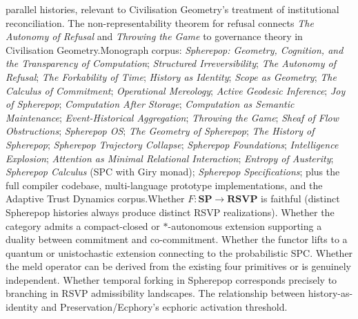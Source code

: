 \documentclass[12pt, twoside]{article}
\begin{document}
{parallel histories, relevant to Civilisation Geometry's treatment of
institutional reconciliation. The non-representability theorem for refusal
connects \emph{The Autonomy of Refusal} and \emph{Throwing the Game} to
governance theory in Civilisation Geometry.}{Monograph corpus: \emph{Spherepop: Geometry, Cognition, and the
Transparency of Computation}; \emph{Structured Irreversibility}; \emph{The
Autonomy of Refusal}; \emph{The Forkability of Time}; \emph{History as
Identity}; \emph{Scope as Geometry}; \emph{The Calculus of Commitment};
\emph{Operational Mereology}; \emph{Active Geodesic Inference}; \emph{Joy of
Spherepop}; \emph{Computation After Storage}; \emph{Computation as Semantic
Maintenance}; \emph{Event-Historical Aggregation}; \emph{Throwing the Game};
\emph{Sheaf of Flow Obstructions}; \emph{Spherepop OS}; \emph{The Geometry
of Spherepop}; \emph{The History of Spherepop}; \emph{Spherepop Trajectory
Collapse}; \emph{Spherepop Foundations}; \emph{Intelligence Explosion};
\emph{Attention as Minimal Relational Interaction}; \emph{Entropy of
Austerity}; \emph{Spherepop Calculus} (SPC with Giry monad); \emph{Spherepop
Specifications}; plus the full compiler codebase, multi-language prototype
implementations, and the Adaptive Trust Dynamics corpus.}{Whether $F: \mathbf{SP} \to \mathbf{RSVP}$ is faithful (distinct Spherepop
histories always produce distinct RSVP realizations). Whether the category
admits a compact-closed or $\ast$-autonomous extension supporting a duality
between commitment and co-commitment. Whether the functor lifts to a quantum
or unistochastic extension connecting to the probabilistic SPC. Whether the
meld operator can be derived from the existing four primitives or is
genuinely independent. Whether temporal forking in Spherepop corresponds
precisely to branching in RSVP admissibility landscapes. The relationship
between history-as-identity and Preservation/Ecphory's ecphoric activation
threshold.}
\end{document}
